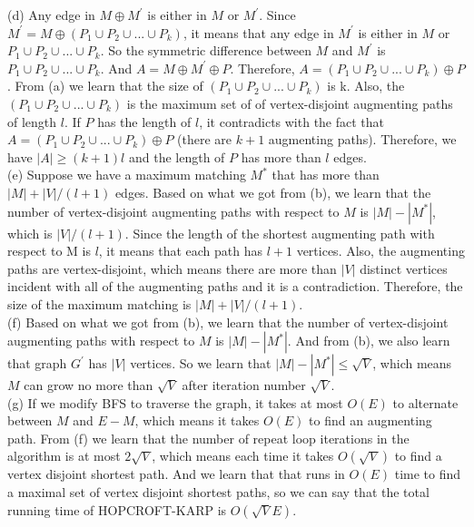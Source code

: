 \documentclass{article}
\begin{document}
(d) Any edge in $M\oplus M^{'}$ is either in $M$ or $M^{'}$. Since $M^{'} = M\oplus (P_1\cup P_2\cup ... \cup P_k)$, it means that any edge in $M^{'}$ is either in $M$ or $P_1\cup P_2\cup ... \cup P_k$. So the symmetric difference between $M$ and $M^{'}$ is $P_1\cup P_2\cup ... \cup P_k$. And $A = M\oplus M^{'}\oplus P$. Therefore, $A = (P_1\cup P_2\cup ... \cup P_k)\oplus P$. From (a) we learn that the size of $(P_1\cup P_2\cup ... \cup P_k)$ is k. Also, the $(P_1\cup P_2\cup ... \cup P_k)$ is the maximum set of of vertex-disjoint augmenting paths of length $l$. If $P$ has the length of $l$, it contradicts with the fact that $A = (P_1\cup P_2\cup ... \cup P_k)\oplus P$ (there are $k+1$ augmenting paths). Therefore, we have $|A| \geq (k + 1)l$ and the length of $P$ has more than $l$ edges. \\\newline
(e) Suppose we have a maximum matching $M^{*}$ that has more than $|M| + |V|/(l + 1)$ edges. Based on what we got from (b), we learn that the number of vertex-disjoint augmenting paths with respect to $M$ is $|M| - |M^{*}|$, which is $|V|/(l + 1)$. Since the length of the shortest augmenting path with respect to M is $l$, it means that each path has $l + 1$ vertices. Also, the augmenting paths are vertex-disjoint, which means there are more than $|V|$ distinct vertices incident with all of the augmenting paths and it is a contradiction. Therefore, the size of the maximum matching is $|M| + |V|/(l + 1)$.\\ \newline
(f) Based on what we got from (b), we learn that the number of vertex-disjoint augmenting paths with respect to $M$ is $|M| - |M^{*}|$. And from (b), we also learn that graph $G^{'}$ has $|V|$ vertices. So we learn that $|M| - |M^{*}| \leq \sqrt{V}$, which means $M$ can grow no more than $\sqrt{V}$ after iteration number $\sqrt{V}$.\\ \newline
(g) If we modify BFS to traverse the graph, it takes at most $O(E)$ to alternate between $M$ and $E - M$, which means it takes $O(E)$ to find an augmenting path. From (f) we learn that the number of repeat loop iterations in the algorithm is at most $2\sqrt{V}$, which means each time it takes $O(\sqrt{V})$ to find a vertex disjoint shortest path. And we learn that that runs in $O(E)$ time to find a maximal set of vertex disjoint shortest paths, so we can say that the total running time of HOPCROFT-KARP is $O(\sqrt{V}E)$. \\
\end{document}
